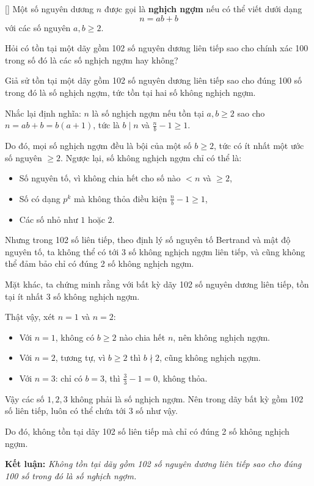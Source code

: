 \documentclass[../09-contruction-methods.tex]{subfiles}
\begin{document}
\begin{example*}\label{example:GER-2015-TST-P2}[\textbf{}]
    Một số nguyên dương \( n \) được gọi là \textbf{nghịch ngợm} nếu có thể viết dưới dạng
    \[
        n = ab + b
    \]
    với các số nguyên \( a, b \geq 2 \).

    Hỏi có tồn tại một dãy gồm 102 số nguyên dương liên tiếp sao cho chính xác 100 trong số đó là các số nghịch ngợm hay không?
\end{example*}

\begin{soln}\footnotemark
	Giả sử tồn tại một dãy gồm 102 số nguyên dương liên tiếp sao cho đúng 100 số trong đó là số nghịch ngợm, tức tồn tại hai số không nghịch ngợm.

	Nhắc lại định nghĩa: \( n \) là số nghịch ngợm nếu tồn tại \( a, b \ge 2 \) sao cho \( n = ab + b = b(a + 1) \), tức là \( b \mid n \) và \( \frac{n}{b} - 1 \ge 1 \).

	Do đó, mọi số nghịch ngợm đều là bội của một số \( b \ge 2 \), tức có ít nhất một ước số nguyên \( \ge 2 \).  
	Ngược lại, số không nghịch ngợm chỉ có thể là:
	\begin{itemize}[topsep=0pt, partopsep=0pt, itemsep=0pt]
		\item Số nguyên tố, vì không chia hết cho số nào \( < n \) và \( \ge 2 \),
		\item Số có dạng \( p^k \) mà không thỏa điều kiện \( \frac{n}{b} - 1 \ge 1 \),
		\item Các số nhỏ như \( 1 \) hoặc \( 2 \).
	\end{itemize}

	Nhưng trong 102 số liên tiếp, theo định lý số nguyên tố Bertrand và mật độ nguyên tố, ta không thể có tới 3 số không nghịch ngợm liên tiếp, và cũng không thể đảm bảo chỉ có đúng 2 số không nghịch ngợm.

	Mặt khác, ta chứng minh rằng với bất kỳ dãy 102 số nguyên dương liên tiếp, tồn tại ít nhất 3 số không nghịch ngợm.

	Thật vậy, xét \( n = 1 \) và \( n = 2 \):  
	\begin{itemize}[topsep=0pt, partopsep=0pt, itemsep=0pt]
		\item Với \( n = 1 \), không có \( b \ge 2 \) nào chia hết \( n \), nên không nghịch ngợm.  
		\item Với \( n = 2 \), tương tự, vì \( b \ge 2 \) thì \( b \nmid 2 \), cũng không nghịch ngợm.  
		\item Với \( n = 3 \): chỉ có \( b = 3 \), thì \( \frac{3}{3} - 1 = 0 \), không thỏa.
	\end{itemize}

	Vậy các số \( 1, 2, 3 \) không phải là số nghịch ngợm.  
	Nên trong dãy bất kỳ gồm 102 số liên tiếp, luôn có thể chứa tới 3 số như vậy.

	Do đó, không tồn tại dãy 102 số liên tiếp mà chỉ có đúng 2 số không nghịch ngợm.  

	\textbf{Kết luận:} \textit{Không tồn tại dãy gồm 102 số nguyên dương liên tiếp sao cho đúng 100 số trong đó là số nghịch ngợm.}
\end{soln}
\end{document}
